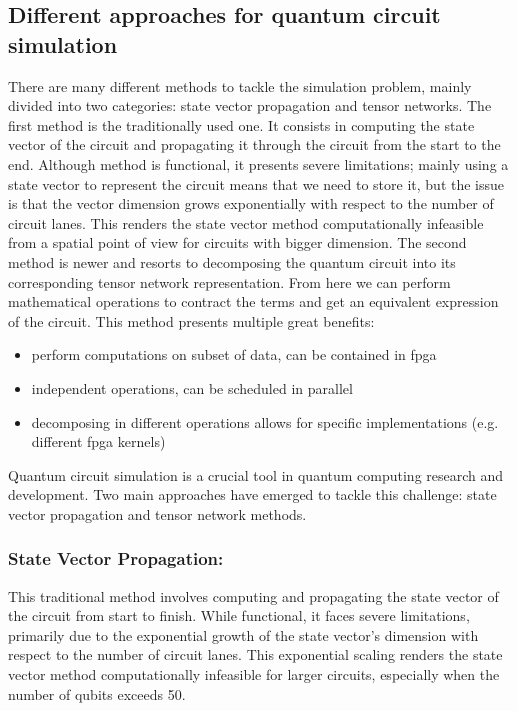 \documentclass[12pt,oneside,a4paper]{article}
\begin{document}
\subsection{Different approaches for quantum circuit simulation}
There are many different methods to tackle the simulation problem, mainly divided into two categories: state vector propagation and tensor networks.
The first method is the traditionally used one. It consists in computing the state vector of the circuit and propagating it through the circuit from the start to the end. Although method is functional, it presents severe limitations; mainly using a state vector to represent the circuit means that we need to store it, but the issue is that the vector dimension grows exponentially with respect to the number of circuit lanes. This renders the state vector method computationally infeasible from a spatial point of view for circuits with bigger dimension.
The second method is newer and resorts to decomposing the quantum circuit into its corresponding tensor network representation. From here we can perform mathematical operations to contract the terms and get an equivalent expression of the circuit.
This method presents multiple great benefits:
\begin{itemize}
    \item perform computations on subset of data, can be contained in fpga
    \item independent operations, can be scheduled in parallel
    \item decomposing in different operations allows for specific implementations (e.g. different fpga kernels)
\end{itemize}

Quantum circuit simulation is a crucial tool in quantum computing research and development. Two main approaches have emerged to tackle this challenge: state vector propagation and tensor network methods.

\subsubsection{State Vector Propagation:}
This traditional method involves computing and propagating the state vector of the circuit from start to finish. While functional, it faces severe limitations, primarily due to the exponential growth of the state vector's dimension with respect to the number of circuit lanes. This exponential scaling renders the state vector method computationally infeasible for larger circuits, especially when the number of qubits exceeds 50.
\end{document}
